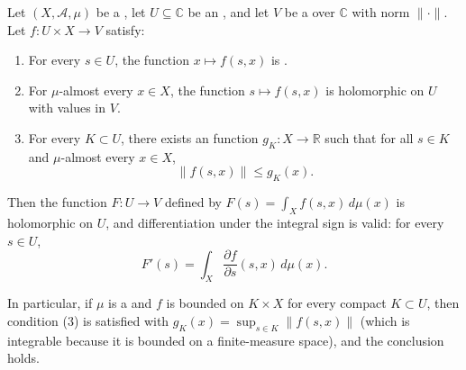\begin{corollary} \label{corollary:compact_domination_criterion_for_holomorphic_parameter_integrals}
    Let $(X, \mathcal{A}, \mu)$ be a , let $U \subseteq \mathbb{C}$ be an , and let $V$ be a  over $\mathbb{C}$ with norm $\|\cdot\|$. Let $f : U \times X \to V$ satisfy:

    \begin{enumerate}
        \item For every $s \in U$, the function $x \mapsto f(s, x)$ is .
        \item For $\mu$-almost every $x \in X$, the function $s \mapsto f(s, x)$ is holomorphic on $U$ with values in $V$.
        \item For every  $K \subset U$, there exists an  function $g_K : X \to \mathbb{R}$ such that for all $s \in K$ and $\mu$-almost every $x \in X$,
        $$\|f(s, x)\| \le g_K(x).$$
    \end{enumerate}

    Then the function $F : U \to V$ defined by $F(s) = \int_X f(s, x) \, d\mu(x)$ is holomorphic on $U$, and differentiation under the integral sign is valid: for every $s \in U$,
    $$F'(s) = \int_X \frac{\partial f}{\partial s}(s, x) \, d\mu(x).$$

    In particular, if $\mu$ is a  and $f$ is bounded on $K \times X$ for every compact $K \subset U$, then condition (3) is satisfied with $g_K(x) = \sup_{s \in K} \|f(s, x)\|$ (which is integrable because it is bounded on a finite-measure space), and the conclusion holds.
\end{corollary}
